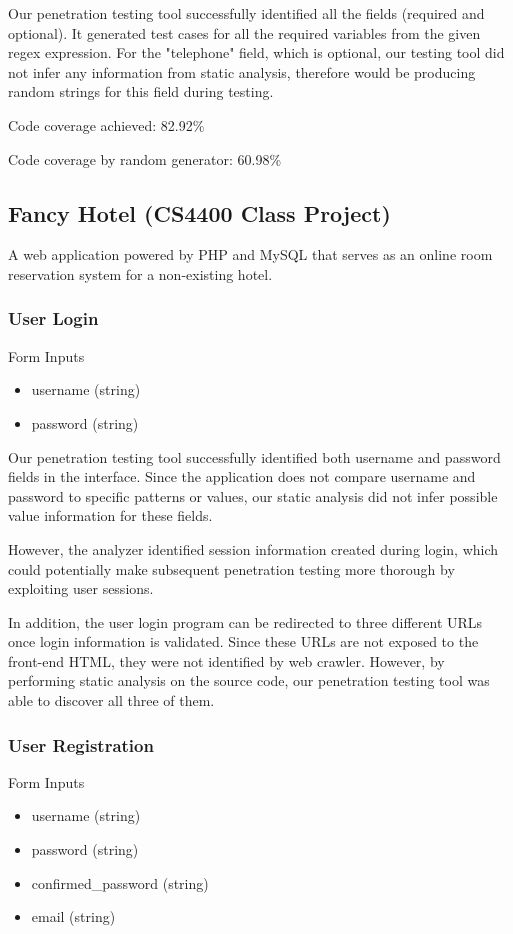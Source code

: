 Our penetration testing tool successfully identified all the fields (required and optional). It generated test cases for all the required variables from the given regex expression. For the "telephone" field, which is optional, our testing tool did not infer any information from static analysis, therefore would be producing random strings for this field during testing.

Code coverage achieved: 82.92\%

Code coverage by random generator: 60.98\%

\subsection{Fancy Hotel (CS4400 Class Project)}
A web application powered by PHP and MySQL that serves as an online room reservation system for a non-existing hotel.

\subsubsection{User Login}
Form Inputs
\begin{itemize}
\item username (string)
\item password (string)
\end{itemize}

Our penetration testing tool successfully identified both username and password fields in the interface. Since the application does not compare username and password to specific patterns or values, our static analysis did not infer possible value information for these fields. 

However, the analyzer identified session information created during login, which could potentially make subsequent penetration testing more thorough by exploiting user sessions.

In addition, the user login program can be redirected to three different URLs once login information is validated. Since these URLs are not exposed to the front-end HTML, they were not identified by web crawler. However, by performing static analysis on the source code, our penetration testing tool was able to discover all three of them.

\subsubsection{User Registration}
Form Inputs
\begin{itemize}
\item username (string)
\item password (string)
\item confirmed\_password (string)
\item email (string)
\end{itemize}

